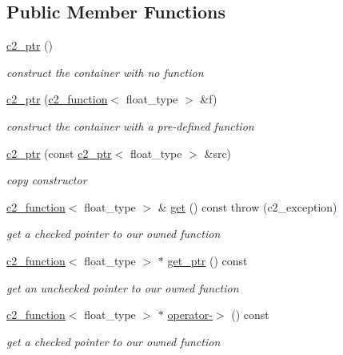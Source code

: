 \subsection*{Public Member Functions}
\begin{DoxyCompactItemize}
\item 
\hyperlink{classc2__ptr_ad49d9f28b27b26366c125973f5f7a8c1}{c2\+\_\+ptr} ()
\begin{DoxyCompactList}\small\item\em construct the container with no function \end{DoxyCompactList}\item 
\hyperlink{classc2__ptr_a43bb3a5a3c7d65127a4782d305c45d15}{c2\+\_\+ptr} (\hyperlink{classc2__function}{c2\+\_\+function}$<$ float\+\_\+type $>$ \&f)
\begin{DoxyCompactList}\small\item\em construct the container with a pre-\/defined function \end{DoxyCompactList}\item 
\hyperlink{classc2__ptr_a0b3aa488bd5a4388048f574c2ef19e60}{c2\+\_\+ptr} (const \hyperlink{classc2__ptr}{c2\+\_\+ptr}$<$ float\+\_\+type $>$ \&src)
\begin{DoxyCompactList}\small\item\em copy constructor \end{DoxyCompactList}\item 
\hyperlink{classc2__function}{c2\+\_\+function}$<$ float\+\_\+type $>$ \& \hyperlink{classc2__ptr_afa91b91ad5c8c3479b02699afbb46d26}{get} () const   throw (c2\+\_\+exception)
\begin{DoxyCompactList}\small\item\em get a checked pointer to our owned function \end{DoxyCompactList}\item 
\hyperlink{classc2__function}{c2\+\_\+function}$<$ float\+\_\+type $>$ $\ast$ \hyperlink{classc2__ptr_a74378bfb73076c3d49156fdbfa063618}{get\+\_\+ptr} () const 
\begin{DoxyCompactList}\small\item\em get an unchecked pointer to our owned function \end{DoxyCompactList}\item 
\hyperlink{classc2__function}{c2\+\_\+function}$<$ float\+\_\+type $>$ $\ast$ \hyperlink{classc2__ptr_ade9595883ae73bfb22843c28045cb448}{operator-\/$>$} () const 
\begin{DoxyCompactList}\small\item\em get a checked pointer to our owned function \end{DoxyCompactList}\item 

\end{DoxyCompactItemize}
